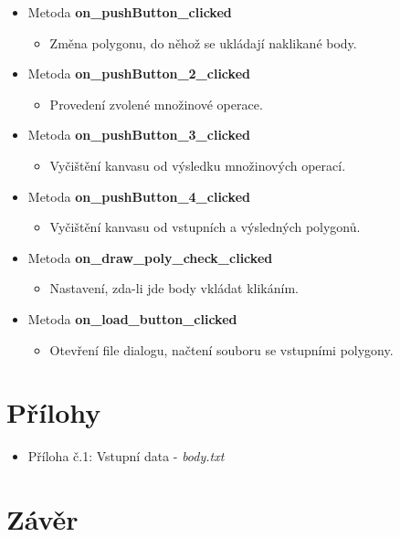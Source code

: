 \documentclass[a4paper, 12pt]{article}
\begin{document}
\begin{itemize}
	\item Metoda \textbf{on\_pushButton\_clicked}
		\begin{itemize}
			\item Změna polygonu, do něhož se ukládají naklikané body.
		\end{itemize}
	\item Metoda \textbf{on\_pushButton\_2\_clicked}
		\begin{itemize}
			\item Provedení zvolené množinové operace.
		\end{itemize}
	\item Metoda \textbf{on\_pushButton\_3\_clicked}
		\begin{itemize}
			\item Vyčištění kanvasu od výsledku množinových operací.
		\end{itemize}
	\item Metoda \textbf{on\_pushButton\_4\_clicked}
		\begin{itemize}
			\item Vyčištění kanvasu od vstupních a výsledných polygonů.
		\end{itemize}
	\item Metoda \textbf{on\_draw\_poly\_check\_clicked}
		\begin{itemize}
			\item Nastavení, zda-li jde body vkládat klikáním.
		\end{itemize}
	\item Metoda \textbf{on\_load\_button\_clicked}
		\begin{itemize}
			\item Otevření file dialogu, načtení souboru se vstupními polygony.
		\end{itemize}
\end{itemize} 

\clearpage

\section{Přílohy}

\begin{itemize}
	\item Příloha č.1: Vstupní data - \textit{body.txt}
\end{itemize}

\section{Závěr}
\end{document}
